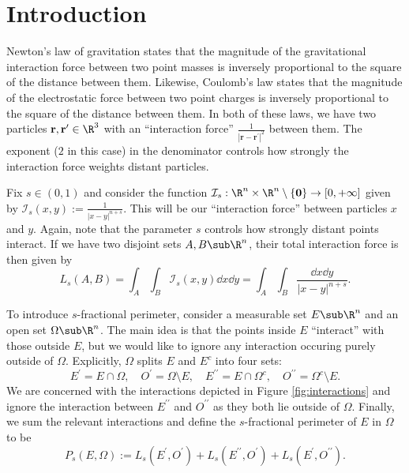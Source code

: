 \documentclass[../main.tex]{subfiles}
\begin{document}
\section{Introduction}

Newton's law of gravitation states that the magnitude of the gravitational interaction force between two point masses is inversely proportional to the square of the distance between them. Likewise, Coulomb's law states that the magnitude of the electrostatic force between two point charges is inversely proportional to the square of the distance between them. In both of these laws, we have two particles $ \mathbf{r},\mathbf{r^{\prime}}\in \R^{3} $ with an ``interaction force'' $  \frac{1}{|\mathbf{r}-\mathbf{r^{\prime}}|^{2}} $ between them. The exponent ($ 2 $ in this case) in the denominator controls how strongly the interaction force weights distant particles. 

Fix $ s\in (0,1) $ and consider the function $ \mathcal{I}_s:\R^{n}\times\R^{n}\setminus \{\mathbf{0}\}\to [0,+\infty] $ given by $ \mathcal{I}_{s}(x,y):= \frac{1}{|x-y|^{n+s}} $. This will be our ``interaction force'' between particles $ x $ and $ y $. Again, note that the parameter $ s $ controls how strongly distant points interact. If we have two disjoint sets $ A,B\sub \R^{n} $, their total interaction force is then given by
\[
    L_{s}(A,B) = \int_{A}\int_{B} \mathcal{I}_{s}(x,y) \dd{x}\dd{y} = \int_{A}\int_{B}\frac{\dd{x}\dd{y}}{|x-y|^{n+s}}.
\]

To introduce $ s $-fractional perimeter, consider a measurable set $ E\sub \R^{n} $ and an open set $ \Omega\sub \R^{n} $. The main idea is that the points inside $ E $ ``interact'' with those outside $ E $, but we would like to ignore any interaction occuring purely outside of $ \Omega $. Explicitly, $ \Omega $ splits $ E $ and $ E^{c} $ into four sets: 
\[
    E^{\prime} = E\cap \Omega, \quad O^{\prime} = \Omega\setminus E, \quad
    E^{\prime\prime} = E\cap \Omega^{c}, \quad O^{\prime\prime} = \Omega^{c}\setminus E.
\]
We are concerned with the interactions depicted in Figure \ref{fig:interactions} and ignore the interaction between $ E^{\prime\prime} $ and $ O^{\prime\prime} $ as they both lie outside of $ \Omega $. Finally, we sum the relevant interactions and define the $ s $-fractional perimeter of $ E $ in $ \Omega $ to be
\[
    P_{s}(E,\Omega) := L_{s}(E^{\prime}, O^{\prime}) + L_{s}(E^{\prime\prime}, O^{\prime}) + L_{s}(E^{\prime}, O^{\prime\prime}).
\]
\end{document}
